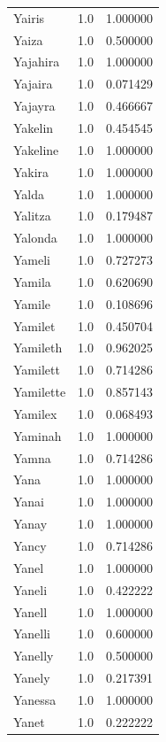 \documentclass[
  letterpaper,
  DIV=11,
  numbers=noendperiod]{scrreprt}
\begin{document}
\begin{tabular}{lrr}
Yairis          &   1.0 &   1.000000 \\
Yaiza           &   1.0 &   0.500000 \\
Yajahira        &   1.0 &   1.000000 \\
Yajaira         &   1.0 &   0.071429 \\
Yajayra         &   1.0 &   0.466667 \\
Yakelin         &   1.0 &   0.454545 \\
Yakeline        &   1.0 &   1.000000 \\
Yakira          &   1.0 &   1.000000 \\
Yalda           &   1.0 &   1.000000 \\
Yalitza         &   1.0 &   0.179487 \\
Yalonda         &   1.0 &   1.000000 \\
Yameli          &   1.0 &   0.727273 \\
Yamila          &   1.0 &   0.620690 \\
Yamile          &   1.0 &   0.108696 \\
Yamilet         &   1.0 &   0.450704 \\
Yamileth        &   1.0 &   0.962025 \\
Yamilett        &   1.0 &   0.714286 \\
Yamilette       &   1.0 &   0.857143 \\
Yamilex         &   1.0 &   0.068493 \\
Yaminah         &   1.0 &   1.000000 \\
Yamna           &   1.0 &   0.714286 \\
Yana            &   1.0 &   1.000000 \\
Yanai           &   1.0 &   1.000000 \\
Yanay           &   1.0 &   1.000000 \\
Yancy           &   1.0 &   0.714286 \\
Yanel           &   1.0 &   1.000000 \\
Yaneli          &   1.0 &   0.422222 \\
Yanell          &   1.0 &   1.000000 \\
Yanelli         &   1.0 &   0.600000 \\
Yanelly         &   1.0 &   0.500000 \\
Yanely          &   1.0 &   0.217391 \\
Yanessa         &   1.0 &   1.000000 \\
Yanet           &   1.0 &   0.222222 \\

\end{tabular}
\end{document}
